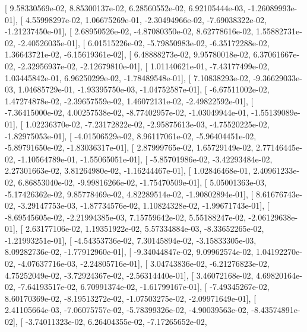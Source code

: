 \documentclass{article}
\begin{document}
       [  9.58330569e-02,   8.85300137e-02,   6.28560552e-02,
          6.92105444e-03,  -1.26089993e-01],
       [  4.55998297e-02,   1.06675269e-01,  -2.30494966e-02,
         -7.69038322e-02,  -1.21237450e-01],
       [  2.68950526e-02,  -4.87080350e-02,   8.62778616e-02,
          1.55882731e-02,  -2.40526035e-01],
       [  6.01515226e-02,  -5.79850983e-02,  -6.35172288e-02,
          1.36643721e-02,  -6.15619361e-02],
       [  6.48888273e-02,   9.95780018e-02,   6.37061667e-02,
         -2.32956937e-02,  -2.12679810e-01],
       [  1.01140621e-01,  -7.43177499e-02,   1.03445842e-01,
          6.96250299e-02,  -1.78489548e-01],
       [  7.10838293e-02,  -9.36629033e-03,   1.04685729e-01,
         -1.93395750e-03,  -1.04752587e-01],
       [ -6.67511002e-02,   1.47274878e-02,  -2.39657559e-02,
          1.46072131e-02,  -2.49822592e-01],
       [ -7.36415000e-02,   4.00257538e-02,  -8.77402957e-02,
         -1.03049944e-01,  -1.55139089e-01],
       [  1.02236370e-02,  -7.23172822e-02,  -2.95875613e-03,
         -4.75520225e-02,  -1.82975053e-01],
       [ -4.01506529e-02,   8.96117061e-02,  -5.96404451e-02,
         -5.89791650e-02,  -1.83036317e-01],
       [  2.87999765e-02,   1.65729149e-02,   2.77146445e-02,
         -1.10564789e-01,  -1.55065051e-01],
       [ -5.85701986e-02,  -3.42293484e-02,   2.27301663e-02,
          3.81264980e-02,  -1.16244467e-01],
       [  1.02846468e-01,   2.40961233e-02,   6.86853040e-02,
         -9.99816266e-02,  -1.75470509e-01],
       [  5.05001363e-03,  -5.17426362e-02,   9.85778469e-02,
          4.82289514e-02,  -1.90802894e-01],
       [  8.61676743e-02,  -3.29147753e-03,  -1.87734576e-02,
          1.10824328e-02,  -1.99671743e-01],
       [ -8.69545605e-02,  -2.21994385e-03,   7.15759642e-02,
          5.55188247e-02,  -2.06129638e-01],
       [  2.63177106e-02,   1.19351922e-02,   5.57334884e-03,
         -8.33652265e-02,  -1.21993251e-01],
       [ -4.54353736e-02,   7.30145894e-02,  -3.15833305e-03,
          8.09282736e-02,  -1.77912960e-01],
       [ -9.34044847e-02,   9.09962574e-02,   1.04192270e-02,
         -4.07637716e-03,  -2.24805716e-01],
       [  3.04743836e-02,  -6.21276823e-02,   4.75252049e-02,
         -3.72924367e-02,  -2.56314440e-01],
       [  3.46072168e-02,   4.69820164e-02,  -7.64193517e-02,
          6.70991374e-02,  -1.61799167e-01],
       [ -7.49345267e-02,   8.60170369e-02,  -8.19513272e-02,
         -1.07503275e-02,  -2.09971649e-01],
       [  2.41105664e-03,  -7.06075757e-02,  -5.78399326e-02,
         -4.90039563e-02,  -8.43574891e-02],
       [ -3.74011323e-02,   6.26404355e-02,  -7.17265652e-02,
\end{document}
